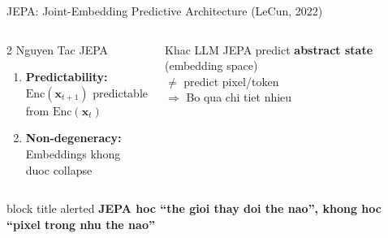 \documentclass[aspectratio=169,12pt]{beamer}
\newcommand{\takeaway}[1]{%
  \vfill
  \begin{beamercolorbox}[sep=4pt,center,rounded=true]{block title alerted}
    \small\bfseries #1
  \end{beamercolorbox}
}
\begin{document}
\begin{frame}{JEPA: Joint-Embedding Predictive Architecture (LeCun, 2022)}
\begin{columns}[c]
\begin{block}{2 Nguyen Tac JEPA}
\begin{enumerate}\small
  \item \textbf{Predictability:}\\
  $\text{Enc}(\mathbf{x}_{t+1})$ predictable\\
  from $\text{Enc}(\mathbf{x}_t)$
  \vspace{4pt}
  \item \textbf{Non-degeneracy:}\\
  Embeddings khong\\
  duoc collapse
\end{enumerate}
\end{block}
\vspace{6pt}
\begin{exampleblock}{Khac LLM}
\small JEPA predict \textbf{abstract state}\\
(embedding space)\\
$\neq$ predict pixel/token\\
$\Rightarrow$ Bo qua chi tiet nhieu
\end{exampleblock}
\end{columns}
\takeaway{JEPA hoc ``the gioi thay doi the nao'', khong hoc ``pixel trong nhu the nao''}
\end{frame}
\end{document}
